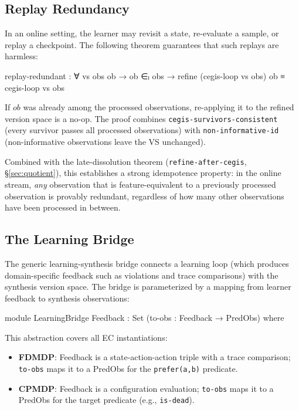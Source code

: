 \documentclass[9pt,a4paper]{article}
\theoremstyle{plain}
\theoremstyle{definition}
\theoremstyle{remark}
\begin{document}
\subsection{Replay Redundancy}
\label{sec:replay}

In an online setting, the learner may revisit a state, re-evaluate a sample, or replay a checkpoint.
The following theorem guarantees that such replays are harmless:

\begin{spec}
    replay-redundant : ∀ vs obs ob →
      ob ∈ₗ obs →
      refine (cegis-loop vs obs) ob ≡ cegis-loop vs obs
\end{spec}

\noindent If $\mathit{ob}$ was already among the processed observations, re-applying it to the refined version space is a no-op.  The proof combines \texttt{cegis-survivors-consistent} (every survivor passes all processed observations) with \texttt{non-informative-id} (non-informative observations leave the VS unchanged).

Combined with the late-dissolution theorem (\texttt{refine-after-cegis}, \S\ref{sec:quotient}), this establishes a strong idempotence property: in the online stream, \emph{any} observation that is feature-equivalent to a previously processed observation is provably redundant, regardless of how many other observations have been processed in between.

\subsection{The Learning Bridge}
\label{sec:bridge}

The generic learning-synthesis bridge connects a learning loop (which produces domain-specific feedback such as violations and trace comparisons) with the synthesis version space.
The bridge is parameterized by a mapping from learner feedback to synthesis observations:

\begin{spec}
    module LearningBridge
      {Feedback : Set}
      (to-obs : Feedback → PredObs)
      where
\end{spec}

\noindent This abstraction covers all EC instantiations:
\begin{itemize}
\item \textbf{FDMDP}: Feedback is a state-action-action triple with a trace comparison; \texttt{to-obs} maps it to a PredObs for the \texttt{prefer(a,b)} predicate.
\item \textbf{CPMDP}: Feedback is a configuration evaluation; \texttt{to-obs} maps it to a PredObs for the target predicate (e.g., \texttt{is-dead}).
\end{itemize}
\end{document}
